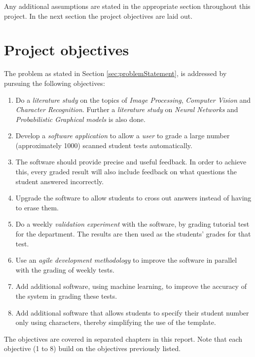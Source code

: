 Any additional assumptions are stated in the appropriate section throughout this project. In the next section the project objectives are laid out.


\section{Project objectives}
\label{sec:Objectives}

The problem as stated in Section \ref{sec:problemStatement}, is addressed by pursuing the following objectives:
\begin{enumerate}
  \item Do a \textsl{literature study} on the topics of \textsl{Image Processing}, \textsl{Computer Vision} and \textsl{Character Recognition}. Further a \textsl{literature study} on \textsl{Neural Networks} and \textsl{Probabilistic Graphical models} is also done.
  \item Develop a \textsl{software application} to allow a \textsl{user} to grade a large number (approximately 1000) scanned student tests automatically.
\item The software should provide precise and useful feedback. In order to achieve this, every graded result will also include feedback on what questions the student answered incorrectly.
\item Upgrade the software to allow students to cross out answers instead of having to erase them.
  \item Do a weekly \textsl{validation experiment} with the software, by grading tutorial test for the department. The results are then used as the students' grades for that test.
  \item Use an \textsl{agile development methodology} to improve the software in parallel with the grading of weekly tests.
  \item Add additional software, using machine learning, to improve the accuracy of the system in grading these tests.
  \item Add additional software that allows students to specify their student number only using characters, thereby simplifying the use of the template.
\end{enumerate}
The objectives are covered in separated chapters in this report. Note that each objective (1 to 8) build on the objectives previously listed.


